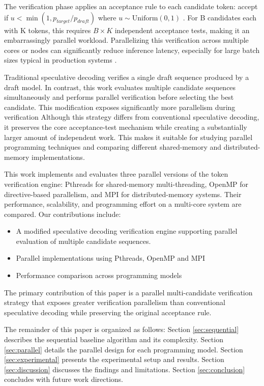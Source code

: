 \documentclass[conference]{IEEEtran}
\begin{document}
The verification phase applies an acceptance rule to each candidate token: accept if $u < \min(1, p_{target}/p_{draft})$ where $u \sim \text{Uniform}(0,1)$ \cite{leviathan2023}. For B candidates each with K tokens, this requires $B \times K$ independent acceptance tests, making it an embarrassingly parallel workload. Parallelizing this verification across multiple cores or nodes can significantly reduce inference latency, especially for large batch sizes typical in production systems \cite{shazeer2019,pope2022}.

Traditional speculative decoding verifies a single draft sequence produced by a draft model. In contrast, this work evaluates multiple candidate sequences simultaneously and performs parallel verification before selecting the best candidate. This modification exposes significantly more parallelism during verification Although this strategy differs from conventional speculative decoding, it preserves the core acceptance-test mechanism while creating a substantially larger amount of independent work. This makes it suitable for studying parallel programming techniques and comparing different shared-memory and distributed-memory implementations.

This work implements and evaluates three parallel versions of the token verification engine: Pthreads for shared-memory multi-threading, OpenMP for directive-based parallelism, and MPI for distributed-memory systems. Their performance, scalability, and programming effort on a multi-core system are compared. Our contributions include:

\begin{itemize}
    \item A modified speculative decoding verification engine supporting parallel evaluation of multiple candidate sequences.
    \item Parallel implementations using Pthreads, OpenMP and MPI
    \item Performance comparison across programming models
\end{itemize}

The primary contribution of this paper is a parallel multi-candidate verification strategy that exposes greater verification parallelism than conventional speculative decoding while preserving the original acceptance rule.

The remainder of this paper is organized as follows: Section \ref{sec:sequential} describes the sequential baseline algorithm and its complexity. Section \ref{sec:parallel} details the parallel design for each programming model. Section \ref{sec:experimental} presents the experimental setup and results. Section \ref{sec:discussion} discusses the findings and limitations. Section \ref{sec:conclusion} concludes with future work directions.
\end{document}
